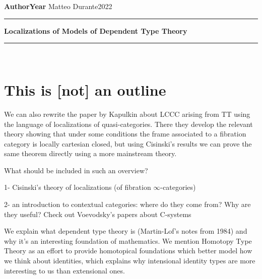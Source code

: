\documentclass[a4paper,fontsize=12pt]{scrartcl}
\begin{document}
\noindent\textbf{Author}\hfill\textbf{Year} \linebreak
\vspace*{-.1cm} Matteo Durante\hfill 2022 \\

\noindent
\rule{\linewidth}{1pt}
\begin{center}
\Large
    \textbf{Localizations of Models of Dependent Type Theory} \\
\end{center}
\rule{\linewidth}{1pt}
\\


\newcommand{\La}{\Lambda}
\newcommand{\pa}{c}
\newcommand{\ob}{\operatorname{Ob}}
\newcommand{\mor}{\operatorname{Mor}}
\newcommand{\sto}{\twoheadrightarrow}

\newcommand{\plim}{\varprojlim}
\newcommand{\sst}{\subseteq}
\newcommand{\eq}{\operatorname{eq}}

\newcommand{\f}{\varphi}

\newcommand{\sing}{\operatorname{Sing}}

\newcommand{\ihom}{\underline{\Hom}}

\section{This is [not] an outline}

We can also rewrite the paper by Kapulkin about LCCC arising from TT using the
language of localizations of quasi-categories. There they develop the relevant
theory showing that under some conditions the frame associated to a fibration
category is locally cartesian closed, but using Cisinski's results we can prove
the same theorem directly using a more mainstream theory.

What should be included in such an overview?

1- Cisinski's theory of localizations (of fibration $\infty$-categories)

2- an introduction to contextual categories: where do they come from? Why are
they useful? Check out Voevodsky's papers about C-systems

We explain what dependent type theory is (Martin-Lof's notes from 1984) and why
it's an interesting foundation of mathematics. We mention Homotopy Type Theory
as an effort to provide homotopical foundations which better model how we think
about identities, which explains why intensional identity types are more
interesting to us than extensional ones.
\end{document}
